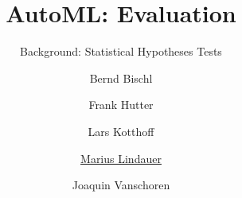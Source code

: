 


\usepackage{multirow}


\title[AutoML: Risks]{AutoML: Evaluation} %
\subtitle{Background: Statistical Hypotheses Tests} %
\author[Marius Lindauer]{Bernd Bischl \and Frank Hutter \and Lars Kotthoff\newline \and \underline{Marius Lindauer} \and Joaquin Vanschoren}
\institute{}
\date{}

\newcommand\reffootnote[1]{%
	\begingroup
	\renewcommand\thefootnote{}\footnote{
		\tiny #1
		\vspace*{1em}}%
	\addtocounter{footnote}{-1}%
	\endgroup
}



	
	\maketitle
	

